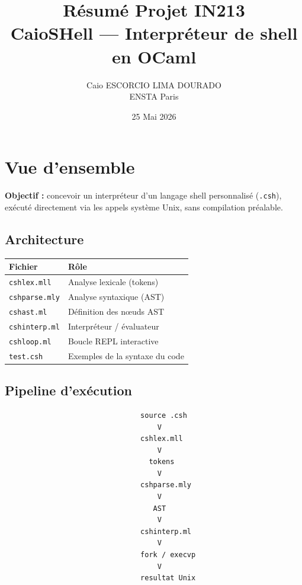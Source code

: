 \documentclass[11pt,a4paper]{article}
\title{
\textbf{Résumé Projet IN213}\\[0.5em]
\large CaioSHell --- Interpréteur de shell en OCaml
}
\author{
Caio ESCORCIO LIMA DOURADO\\
ENSTA Paris
}
\date{25 Mai 2026}
\begin{document}
\maketitle
\tableofcontents
\clearpage

\section{Vue d'ensemble}

\textbf{Objectif :}
concevoir un interpréteur d'un langage shell personnalisé
(\texttt{.csh}), exécuté directement via les appels système Unix,
sans compilation préalable.

\subsection{Architecture}

\begin{longtable}{|p{4cm}|p{9cm}|}
\hline
\textbf{Fichier} & \textbf{Rôle} \\
\hline
\texttt{cshlex.mll} & Analyse lexicale (tokens) \\
\hline
\texttt{cshparse.mly} & Analyse syntaxique (AST) \\
\hline
\texttt{cshast.ml} & Définition des nœuds AST \\
\hline
\texttt{cshinterp.ml} & Interpréteur / évaluateur \\
\hline
\texttt{cshloop.ml} & Boucle REPL interactive \\
\hline
\texttt{test.csh} & Exemples de la syntaxe du code \\
\hline
\end{longtable}

\subsection{Pipeline d'exécution}

\begin{lstlisting}
                                source .csh
                                    V
                                cshlex.mll
                                    V
                                  tokens
                                    V
                                cshparse.mly
                                    V
                                   AST
                                    V
                                cshinterp.ml
                                    V
                                fork / execvp
                                    V
                                resultat Unix
\end{lstlisting}
\end{document}
